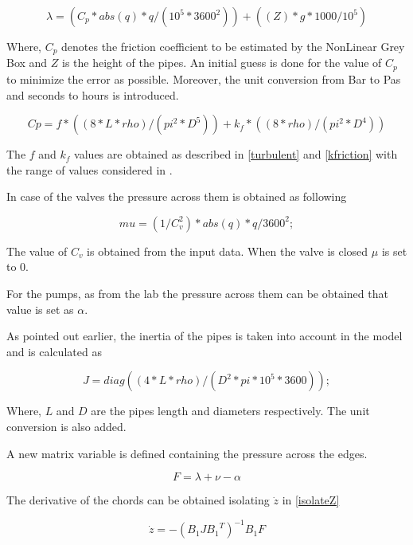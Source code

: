 \begin{equation}
\lambda = (C_p * abs(q)*q /(10^5*3600^2)) + ((Z)*g*1000/10^5)
\end{equation}

Where, $C_p$ denotes the friction coefficient to be estimated by the NonLinear Grey Box and $Z$ is the height of the pipes. An initial guess is done for the value of $C_p$ to minimize the error 
as possible. Moreover, the unit conversion from Bar to Pas and seconds to hours is introduced.

\begin{equation}
  Cp= f*((8*L*rho)/(pi^2*D^5))+k_f*((8*rho)/(pi^2*D^4))
\end{equation}

The $f$ and $k_f$ values are obtained as described in \eqref{turbulent} and \eqref{kfriction} with the range of values considered in .

In case of the valves the pressure across them is obtained as following

\begin{equation}
  mu = (1/C_v^2)* abs(q)*q /3600^2;
\end{equation}

The value of $C_v$ is obtained from the input data. When the valve is closed $\mu$ is set to 0. 

For the pumps, as from the lab the pressure across them can be obtained that value is set as $\alpha$. 

As pointed out earlier, the inertia of the pipes is taken into account in the model and is calculated as

\begin{equation}
  J = diag((4*L*rho)/(D^2*pi*10^5*3600));
\end{equation}

Where, $L$ and $D$ are the pipes length and diameters respectively. The unit conversion is also added. 

A new matrix variable is defined containing the pressure across the edges.

\begin{equation}
  F = \lambda + \nu - \alpha
\end{equation}

The derivative of the chords can be obtained isolating $\dot{z}$ in \eqref{isolateZ}

\begin{equation}
  \dot{z}  =  - (B_1 J {B_1}^T)^{-1}B_1 F
  \label{chordder}
\end{equation}

